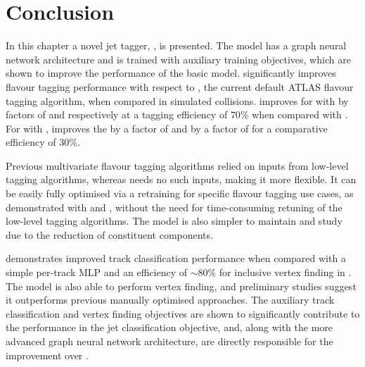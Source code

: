

\section{Conclusion}\label{sec:gnn_conclusion}

In this chapter a novel jet tagger, \GNN, is presented.
The model has a graph neural network architecture and is trained with auxiliary training objectives, which are shown to improve the performance of the basic model.
\GNN significantly improves flavour tagging performance with respect to \DLr, the current default ATLAS flavour tagging algorithm, when compared in simulated collisions.
\GNN improves \clrej for \ttbarjets with \ttbarpt by factors of \ttbclo and \ttbllo respectively at a \bjet tagging efficiency of $70\%$ when compared with \DLr.
For \Zprimejets with \Zprimept, \GNN improves the \crej by a factor of \zpbclo and \lrej by a factor of \zpbllo for a comparative \bjet efficiency of $30\%$.

Previous multivariate flavour tagging algorithms relied on inputs from low-level tagging algorithms, whereas \GNN needs no such inputs, making it more flexible. It can be easily fully optimised via a retraining for specific flavour tagging use cases, as demonstrated with \ctag and \highpt \btag, without the need for time-consuming retuning of the low-level tagging algorithms.
The model is also simpler to maintain and study due to the reduction of constituent components.

\GNN demonstrates improved track classification performance when compared with a simple per-track MLP and an efficiency of $\sim80\%$ for inclusive vertex finding in \bjets.
The model is also able to perform vertex finding, and preliminary studies suggest it outperforms previous manually optimised approaches.
The auxiliary track classification and vertex finding objectives are shown to significantly contribute to the performance in the jet classification objective, and, along with the more advanced graph neural network architecture, are directly responsible for the improvement over \DLr.

